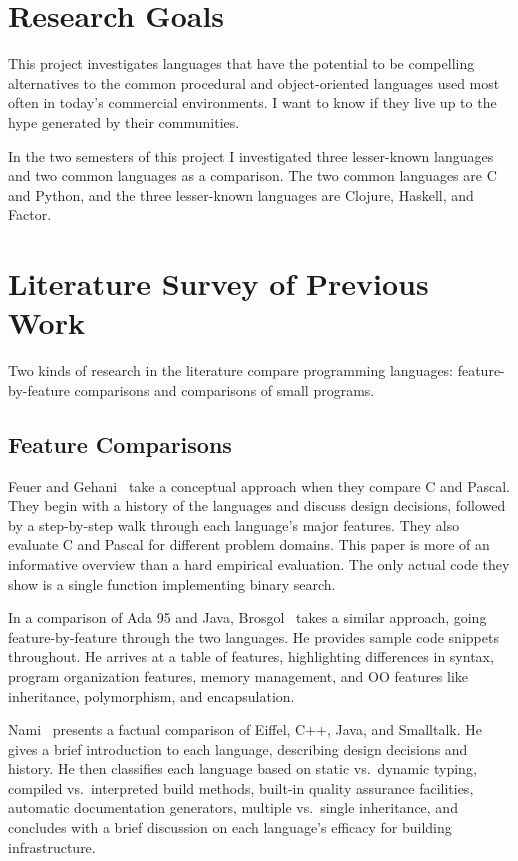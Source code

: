 \documentclass{article}
\begin{document}
\section{Research Goals}

This project investigates languages that have the potential to be
compelling alternatives to the common procedural and object-oriented languages
used most often in today's commercial environments.  I want to know if they live
up to the hype generated by their communities.

In the two semesters of this project I investigated three lesser-known
languages and two common languages as a comparison.  The two common languages
are C and Python, and the three lesser-known languages are Clojure, Haskell,
and Factor.  

\section{Literature Survey of Previous Work}
\label{sec:survey}

Two kinds of research in the literature compare programming languages:
feature-by-feature comparisons and comparisons of small programs.

\subsection{Feature Comparisons}

Feuer and Gehani~\cite{FeuerCVsPascal} take a conceptual approach when they compare C and
Pascal.  They begin with a history of the languages and
discuss design decisions, followed by a step-by-step walk through each
language's major features.  They also evaluate C and Pascal for different
problem domains.  This paper is more of an informative overview than a hard
empirical evaluation.  The only actual code they show is a single function
implementing binary search.

In a comparison of Ada 95 and Java, Brosgol~\cite{BrosgolCompOOAdaVsJava} takes
a similar approach, going feature-by-feature through the two languages.  He
provides sample code snippets throughout.  He arrives at a table of features,
highlighting differences in syntax, program organization features, memory
management, and OO features like inheritance, polymorphism, and encapsulation.

Nami~\cite{NamiCompOOSoftEng} presents a factual comparison of Eiffel, C++, Java, and
Smalltalk.  He gives a brief introduction to each
language, describing design decisions and history.  He then classifies each
language based on static vs.~dynamic typing, compiled vs.~interpreted build
methods, built-in quality assurance facilities, automatic documentation
generators, multiple vs.~single inheritance, and concludes with a brief
discussion on each language's efficacy for building infrastructure.
\end{document}
